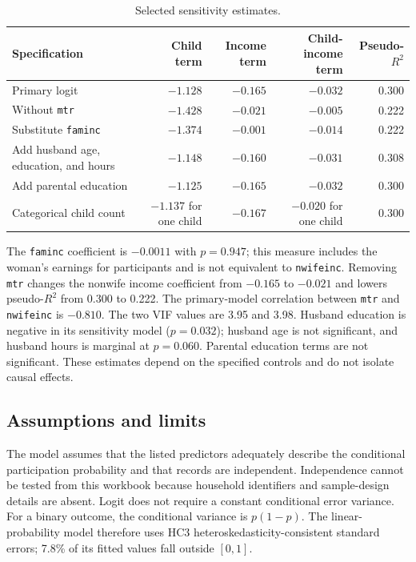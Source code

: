 \documentclass[conference]{IEEEtran}
\begin{document}
\begin{table}[!t]
\centering
\caption{Selected sensitivity estimates.}
\label{tab:sensitivity}
\small
\begin{tabularx}{\textwidth}{Xrrrr}
\toprule
Specification & Child term & Income term & Child-income term & Pseudo-$R^2$ \\
\midrule
Primary logit & $-1.128$ & $-0.165$ & $-0.032$ & 0.300 \\
Without \texttt{mtr} & $-1.428$ & $-0.021$ & $-0.005$ & 0.222 \\
Substitute \texttt{faminc} & $-1.374$ & $-0.001$ & $-0.014$ & 0.222 \\
Add husband age, education, and hours & $-1.148$ & $-0.160$ & $-0.031$ & 0.308 \\
Add parental education & $-1.125$ & $-0.165$ & $-0.032$ & 0.300 \\
Categorical child count & $-1.137$ for one child & $-0.167$ & $-0.020$ for one child & 0.300 \\
\bottomrule
\end{tabularx}
\end{table}

The \texttt{faminc} coefficient is $-0.0011$ with $p=0.947$; this measure includes the woman's earnings for participants and is not equivalent to \texttt{nwifeinc}. Removing \texttt{mtr} changes the nonwife income coefficient from $-0.165$ to $-0.021$ and lowers pseudo-$R^2$ from 0.300 to 0.222. The primary-model correlation between \texttt{mtr} and \texttt{nwifeinc} is $-0.810$. The two VIF values are 3.95 and 3.98. Husband education is negative in its sensitivity model ($p=0.032$); husband age is not significant, and husband hours is marginal at $p=0.060$. Parental education terms are not significant. These estimates depend on the specified controls and do not isolate causal effects.

\subsection{Assumptions and limits}
The model assumes that the listed predictors adequately describe the conditional participation probability and that records are independent. Independence cannot be tested from this workbook because household identifiers and sample-design details are absent. Logit does not require a constant conditional error variance. For a binary outcome, the conditional variance is $p(1-p)$. The linear-probability model therefore uses HC3 heteroskedasticity-consistent standard errors; 7.8\% of its fitted values fall outside $[0,1]$.
\end{document}
